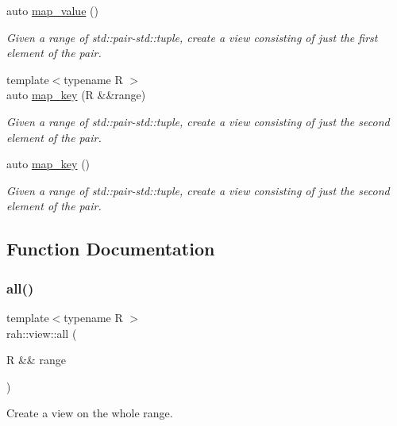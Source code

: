 \begin{DoxyCompactItemize}
auto \mbox{\hyperlink{namespacerah_1_1view_ae022a4f4c20c2d288b5fa1c68441fb8f}{map\+\_\+value}} ()
\begin{DoxyCompactList}\small\item\em Given a range of std\+::pair-\/std\+::tuple, create a view consisting of just the first element of the pair. \end{DoxyCompactList}\item 
{\footnotesize template$<$typename R $>$ }\\auto \mbox{\hyperlink{namespacerah_1_1view_a30b890451bfedbb15ed2114ed62beebc}{map\+\_\+key}} (R \&\&range)
\begin{DoxyCompactList}\small\item\em Given a range of std\+::pair-\/std\+::tuple, create a view consisting of just the second element of the pair. \end{DoxyCompactList}\item 
auto \mbox{\hyperlink{namespacerah_1_1view_aa42d84e34eaf06e2d04d650d1483ac68}{map\+\_\+key}} ()
\begin{DoxyCompactList}\small\item\em Given a range of std\+::pair-\/std\+::tuple, create a view consisting of just the second element of the pair. \end{DoxyCompactList}\end{DoxyCompactItemize}


\subsection{Function Documentation}
\mbox{\label{namespacerah_1_1view_a08f246d1e3e728738c48741274f5e9d7}} 
\subsubsection{\texorpdfstring{all()}{all()}\hspace{0.1cm}{\footnotesize\ttfamily [1/2]}}
{\footnotesize\ttfamily template$<$typename R $>$ \\
rah\+::view\+::all (\begin{DoxyParamCaption}\item[{R \&\&}]{range }\end{DoxyParamCaption})}



Create a view on the whole range. 

